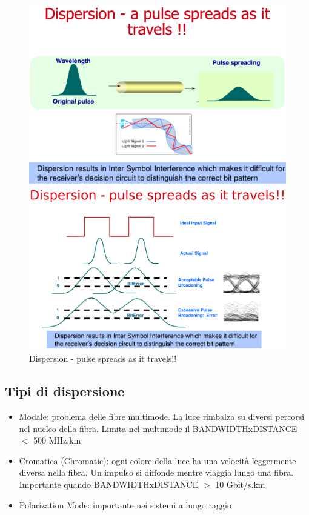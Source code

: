 \documentclass[8pt]{extarticle}
\begin{document}
\begin{figure}[H]
    \centering
    \begin{minipage}[c]{\linewidth}
        \begin{minipage}[l]{0.48\linewidth}
            \includegraphics[width=\linewidth]{images/FO7.png}
        \end{minipage}
        \hspace{0.04\linewidth}
        \begin{minipage}[l]{0.48\linewidth}
            \includegraphics[width=\linewidth]{images/FO8.png}
        \end{minipage}
        \caption{Dispersion - pulse spreads as it travels!!}\label{fig:1}
    \end{minipage}
\end{figure}
\subsection{Tipi di dispersione}
\begin{itemize}
	\item Modale: problema delle fibre multimode. La luce rimbalza su diversi percorsi nel nucleo della fibra. Limita nel multimode il BANDWIDTHxDISTANCE $<$ 500 MHz.km
    \item Cromatica (Chromatic): ogni colore della luce ha una velocità leggermente diversa nella fibra. Un impulso si diffonde mentre viaggia lungo una fibra. Importante quando BANDWIDTHxDISTANCE $>$ 10 Gbit/s.km
    \item Polarization Mode: importante nei sistemi a lungo raggio
\end{itemize}
\end{document}

